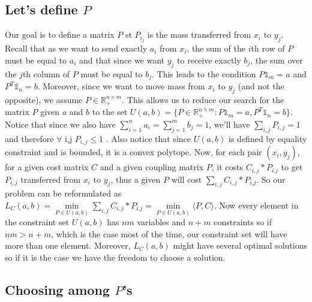 \documentclass[a4paper]{article}
\theoremstyle{definition}
\theoremstyle{remark}
\newcommand{\R}{\mathbb{R}}
\begin{document}
\subsection*{Let's define $P$}

Our goal is to define a matrix $P$ st $P_{i_j}$ is the mass transferred from $x_i$ to $y_j$. Recall that as we want to send exactly $a_i$ from $x_i$, the sum of the $i$th row of $P$ must be equal to $a_i$ and that since we want $y_j$ to receive exactly $b_j$, the sum over the $j$th column of $P$ must be equal to $b_j$. This leads to the condition $P\mathbb{1}_m=a$ and $P^T\mathbb{1}_n=b$. Moreover, since we want to move mass from $x_i$ to $y_j$ (and not the opposite), we assume $P\in \R^{n\times m}_+$. This allows us to reduce our search for the matrix $P$ given $a$ and $b$ to the set $U(a,b)=\{P\in \R^{n\times m}_+: P\mathbb{1}_m=a, P^T\mathbb{1}_n=b\}$.   Notice that since we also have $\sum\limits_{i=1}^n a_i=\sum\limits_{j=1}^m b_j=1$, we'll have $\sum\limits_{i,j}P_{i,j}=1$ and therefore $\forall$ i,j $P_{i,j}\leq 1$ . Also notice that since $U(a,b)$ is defined by equality constraint and is bounded, it is a convex polytope. Now, for each pair $(x_i, y_j)$, for a given cost matrix $C$ and a given coupling matrix $P$, it costs $C_{i,j}*P_{i.j}$ to get $P_{i,j}$ transferred from $x_i$ to $y_j$, thus a given $P$ will cost $\sum\limits_{i,j}C_{i,j}*P_{i.j}$. So our problem can be reformulated as $L_C(a,b)=\min\limits_{P\in U(a,b)}\sum\limits_{i,j}C_{i,j}*P_{i.j}=\min\limits_{P\in U(a,b)}\langle P,C \rangle$. Now every element in the constraint set $U(a,b)$ has $nm$ variables and $n+m$ constraints so if $nm>n+m$, which is the case most of the time, our constraint set will have more than one element. Moreover, $L_C(a,b)$ might have several optimal solutions so if it is the case we have the freedom to choose a solution. 

\subsection*{Choosing among $P$'s}
\end{document}
